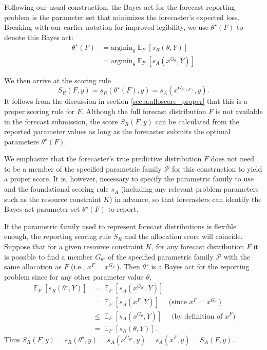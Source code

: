\documentclass{article}\usepackage[]{graphicx}\usepackage[]{xcolor}
\DeclareMathOperator{\Ex}{\mathbb{E}}
\begin{document}
Following our usual construction, the Bayes act for the forecast reporting problem is the parameter set that minimizes
the forecaster's expected loss. Breaking with our earlier notation for improved legibility, we use $\theta^\star(F)$ to
denote this Bayes act:
\begin{align*}
\theta^\star(F) &= \text{argmin}_\theta \Ex_F [s_R(\theta, Y)] \\
&= \text{argmin}_\theta \Ex_F [s_A(x^{G_\theta}, Y)]
\end{align*}

We then arrive at the scoring rule
$$S_R(F, y) = s_R(\theta^\star(F), y) = s_A(x^{G_{\theta^\star(F)}}, y).$$
It follows from the discussion in section \ref{sec:a:alloscore_proper} that this is a proper scoring rule for $F$.
Although the full forecast distribution $F$ is not available in the forecast submission, the score $S_R(F, y)$ can be
calculated from the reported parameter values as long as the forecaster submits the optimal parameters
$\theta^\star(F)$.

We emphasize that the forecaster's true predictive distribution $F$ does not need to be a member of the specified
parametric family $\mathcal{P}$ for this construction to yield a proper score. It is, however, necessary to specify the
parametric family to use and the foundational scoring rule $s_A$ (including any relevant problem parameters such as the
resource constraint $K$) in advance, so that forecasters can identify the Bayes act parameter set $\theta^\star(F)$ to
report.

If the parametric family used to represent forecast distributions is flexible enough, the reporting scoring rule $S_R$
and the allocation score will coincide.
Suppose that for a given resource constraint $K$, for any forecast distribution $F$ it is possible to find a member
$G_{\theta^\star}$ of the specified parametric family $\mathcal{P}$ with the same allocation as $F$ (i.e., 
$x^F = x^{G_{\theta^\star}}$). Then $\theta^\star$ is a Bayes act for the reporting problem since for any other
parameter value
$\theta$,
\begin{align*}
\Ex_F[s_R(\theta^\star, Y)] &= \Ex_F[ s_A(x^{G_{\theta^\star}}, Y) ] \\
&= \Ex_F[s_A(x^F, Y)]  \quad \text{ (since $x^F = x^{G_{\theta^\star}}$)} \\
&\leq \Ex_F[ s_A(x^{G_\theta}, Y) ]  \quad \text{ (by definition of $x^F$)} \\
&= \Ex_F[ s_R(\theta, Y)].
\end{align*}
Thus $S_R(F, y) = s_R(\theta^\star, y) 
= s_A(x^{G_{\theta^\star}}, y) 
= s_A(x^F, y) 
= S_A(F, y)$.
\end{document}
